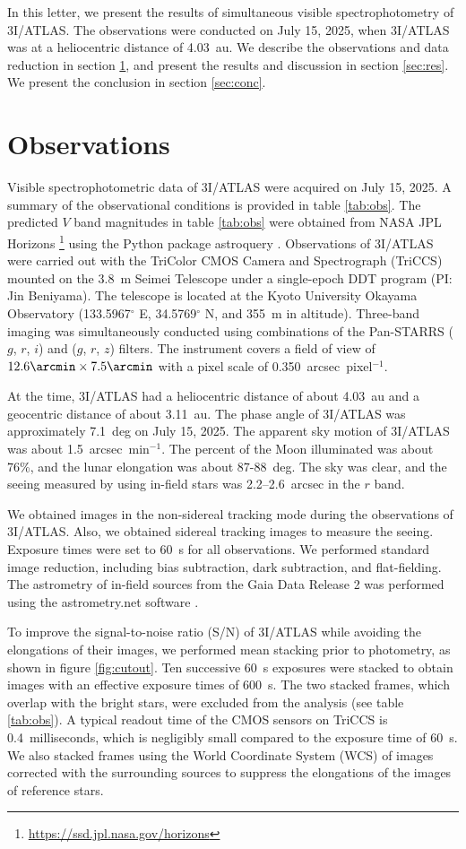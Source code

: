 \documentclass[]{pasj02}
\newcommand\I{3I/ATLAS\xspace}
\begin{document}
In this letter, we present the results of simultaneous visible spectrophotometry of \I.
The observations were conducted on July 15, 2025, when \I was at a heliocentric distance of 4.03~au.
We describe the observations and data reduction in section \ref{sec:obs}, and present the results and discussion in section \ref{sec:res}.
We present the conclusion in section \ref{sec:conc}.

\section{Observations}\label{sec:obs}
Visible spectrophotometric data of \I were acquired on July 15, 2025.
A summary of the observational conditions is provided in table \ref{tab:obs}.
The predicted $V$ band magnitudes in table \ref{tab:obs} were obtained from NASA JPL Horizons \footnote{\url{https://ssd.jpl.nasa.gov/horizons}} using the Python package astroquery \citep{Ginsburg2019}.
Observations of \I were carried out with the TriColor CMOS Camera and Spectrograph (TriCCS) mounted on the 3.8~m Seimei Telescope \citep{Kurita2020} 
under a single-epoch DDT program (PI: Jin Beniyama).
The telescope is located at the Kyoto University Okayama Observatory (133.5967$^\circ$ E, 34.5769$^\circ$ N, and 355~m in altitude).
Three-band imaging was simultaneously conducted using combinations of the Pan-STARRS ($g$, $r$, $i$) and ($g$, $r$, $z$) filters.
The instrument covers a field of view of $12.6\arcmin \times 7.5\arcmin$ with a pixel scale of 0.350~arcsec~pixel$^{-1}$.

At the time, \I had a heliocentric distance of about 4.03~au and a geocentric distance of about 3.11~au.
The phase angle of \I was approximately 7.1~deg on July 15, 2025.
The apparent sky motion of \I was about 1.5~arcsec~min$^{-1}$.
The percent of the Moon illuminated was about 76\%, and the lunar elongation was about 87-88~deg.
The sky was clear, and the seeing measured by using in-field stars was 2.2--2.6~arcsec in the $r$ band.

We obtained images in the non-sidereal tracking mode during the observations of \I.
Also, we obtained sidereal tracking images to measure the seeing.
Exposure times were set to 60~s for all observations.
We performed standard image reduction, including bias subtraction, dark subtraction, and flat-fielding.
The astrometry of in-field sources from the Gaia Data Release 2 was performed using the astrometry.net software \citep{Lang2010}.

To improve the signal-to-noise ratio (S/N) of \I while avoiding the elongations of their images, we performed mean stacking prior to photometry, as shown in figure \ref{fig:cutout}.
Ten successive 60~s exposures were stacked to obtain images with an effective exposure times of 600~s.
The two stacked frames, which overlap with the bright 
stars, were excluded from the analysis (see table \ref{tab:obs}).
A typical readout time of the CMOS sensors on TriCCS is 0.4~milliseconds,
which is negligibly small compared to the exposure time of 60~s.
We also stacked frames using the World Coordinate System (WCS) of images corrected with the surrounding sources to suppress the elongations of the images of reference stars.
\end{document}

